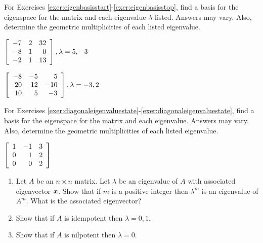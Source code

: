 \noindent For Exercises \ref{exer:eigenbasisstart}-\ref{exer:eigenbasisstop}, find a basis for the eigenspace for the matrix and each eigenvalue $\lambda$ listed. Answers may vary. Also, determine the geometric multiplicities of each listed eigenvalue. 
\begin{enumerate}[!HW!, label=$\spadesuit$ \arabic*., ref=\arabic*]
\begin{multicols}{2}
\item\label{exer:eigenbasisstart} $\mtx{rrr}{-7&2&32\\-8&1&0\\-2&1&13}, \lambda = 5, -3$
\item\label{exer:eigenbasisstop} $\mtx{rrr}{-8&-5&5\\20&12&-10\\10&5&-3}, \lambda = -3, 2$ 
\end{multicols}
\end{enumerate}

\noindent For Exercises \ref{exer:diagonaleigenvaluestate}-\ref{exer:diagonaleigenvaluestate}, find a basis for the eigenspace for the matrix and each eigenvalue. Answers may vary. Also, determine the geometric multiplicities of each listed eigenvalue. 
\begin{enumerate}[!HW!]
\begin{multicols}{3}
    \item\label{exer:diagonaleigenvaluestate} \label{exer:diagonaleigenvaluestop} $\mtx{rrr}{1&-1&3\\0&1&2\\0&0&2}$ %
\end{multicols}
\end{enumerate}

\begin{enumerate}[!HW!]
\item\label{exer:squareeigenvalue} Let $A$ be an $n\times n$ matrix. Let $\lambda$ be an eigenvalue of $A$ with associated eigenvector $\bb x$. Show that if $m$ is a positive integer then $\lambda^m$ is an eigenvalue of $A^m$. What is the associated eigenvector?\\ %
\item Show that if $A$ is idempotent then $\lambda = 0, 1$.\\ %
\item Show that if $A$ is nilpotent then $\lambda = 0$. %
\end{enumerate}


 \mbox{}\vfill
 
\pagebreak